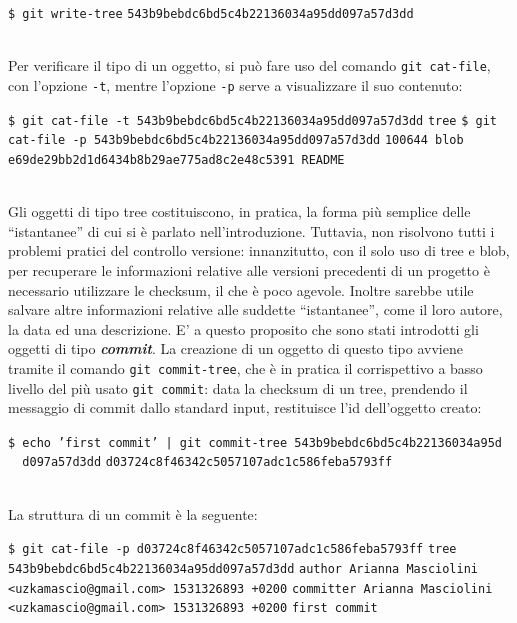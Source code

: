 \documentclass[12pt]{article}
\def\code#1{\texttt{#1}}
\def\quote#1{``#1''}
\begin{document}
\begin{algorithm*}
	\begin{algorithmic}
		\State \code{\$ git write-tree}
		\State \code{543b9bebdc6bd5c4b22136034a95dd097a57d3dd}	
	\end{algorithmic}
\end{algorithm*}
\ \\Per verificare il tipo di un oggetto, si può fare uso del comando \code{git cat-file}, con l'opzione \code{-t}, mentre l'opzione \code{-p} serve a visualizzare il suo contenuto:
\begin{algorithm*}
	\begin{algorithmic}
		\State \code{\$ git cat-file -t 543b9bebdc6bd5c4b22136034a95dd097a57d3dd}
		\State \code{tree}
		\State \code{\$ git cat-file -p 543b9bebdc6bd5c4b22136034a95dd097a57d3dd}
		\State \code{100644 blob e69de29bb2d1d6434b8b29ae775ad8c2e48c5391 README}
	\end{algorithmic}
\end{algorithm*}
\ \\ 
Gli oggetti di tipo tree costituiscono, in pratica, la forma più semplice delle \quote{istantanee} di cui si è parlato nell'introduzione. Tuttavia, non risolvono tutti i problemi pratici del controllo versione: innanzitutto, con il solo uso di tree e blob, per recuperare le informazioni relative alle versioni precedenti di un progetto è necessario utilizzare le checksum, il che è poco agevole. Inoltre sarebbe utile salvare altre informazioni relative alle suddette \quote{istantanee}, come il loro autore, la data ed una descrizione. E' a questo proposito che sono stati introdotti gli oggetti di tipo \textit{\textbf{commit}}.
La creazione di un oggetto di questo tipo avviene tramite il comando \code{git commit-tree}, che è in pratica il corrispettivo a basso livello del più usato \code{git commit}: data la checksum di un tree, prendendo il messaggio di commit dallo standard input, restituisce l'id dell'oggetto creato:
\begin{algorithm*}
	\begin{algorithmic}
		\State \code{\$ echo 'first commit' | git commit-tree 543b9bebdc6bd5c4b22136034a95d\\ \ \ d097a57d3dd}
		\State \code{d03724c8f46342c5057107adc1c586feba5793ff}
	\end{algorithmic}
\end{algorithm*}
\ \\ 
La struttura di un commit è la seguente:
\begin{algorithm*}
	\begin{algorithmic}
		\State \code{\$ git cat-file -p d03724c8f46342c5057107adc1c586feba5793ff}
		\State \code{tree 543b9bebdc6bd5c4b22136034a95dd097a57d3dd}
		\State \code{author Arianna Masciolini <uzkamascio@gmail.com> 1531326893 +0200}
		\State \code{committer Arianna Masciolini <uzkamascio@gmail.com> 1531326893 +0200}
		\State 
		\State \code{first commit}
	\end{algorithmic}
\end{algorithm*}
\ \\ 
\end{document}
